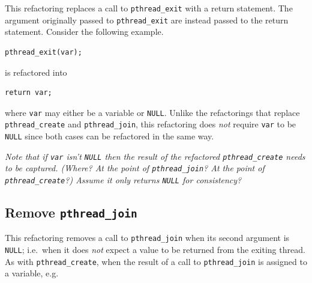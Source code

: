 This refactoring replaces a call to \lstinline|pthread_exit| with a return statement. The argument originally passed to \lstinline|pthread_exit| are instead passed to the return statement. Consider the following example.

\begin{lstlisting}[frame=single]
pthread_exit(var);
\end{lstlisting}

\noindent
is refactored into

\begin{lstlisting}[frame=single]
return var;
\end{lstlisting}

\noindent
where \lstinline|var| may either be a variable or \lstinline|NULL|. Unlike the refactorings that replace \lstinline|pthread_create| and \lstinline|pthread_join|, this refactoring does \emph{not} require \lstinline|var| to be \lstinline|NULL| since both cases can be refactored in the same way.



\emph{Note that if \lstinline|var| \emph{isn't} \lstinline|NULL| then the result of the refactored \lstinline|pthread_create| needs to be captured. (Where? At the point of \lstinline|pthread_join|? At the point of \lstinline|pthread_create|?) Assume it only returns \lstinline|NULL| for consistency?}

\subsection{Remove \lstinline|pthread_join|}

This refactoring removes a call to \lstinline|pthread_join| when its second argument is \lstinline|NULL|; i.e.\ when it does \emph{not} expect a value to be returned from the exiting thread. As with \lstinline|pthread_create|, when the result of a call to \lstinline|pthread_join| is assigned to a variable, e.g.\

